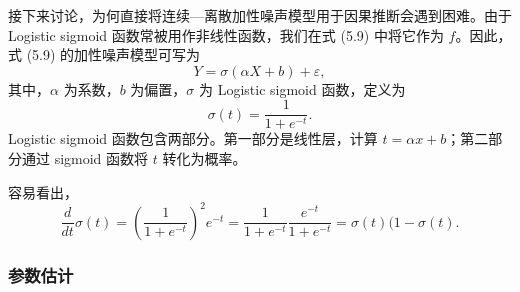 接下来讨论，为何直接将连续—离散加性噪声模型用于因果推断会遇到困难。由于 Logistic sigmoid 函数常被用作非线性函数，我们在式 (5.9) 中将它作为 $f$。因此，式 (5.9) 的加性噪声模型可写为
\begin{equation}
Y=\sigma(\alpha X+b)+\varepsilon,
\tag{5.10}
\end{equation}
其中，$\alpha$ 为系数，$b$ 为偏置，$\sigma$ 为 Logistic sigmoid 函数，定义为
\begin{equation}
\sigma(t)=\frac1{1+e^{-t}}.
\tag{5.11}
\end{equation}
Logistic sigmoid 函数包含两部分。第一部分是线性层，计算 $t=\alpha x+b$；第二部分通过 sigmoid 函数将 $t$ 转化为概率。

容易看出，
\begin{equation}
\frac{d}{dt}\sigma(t)
=\left(\frac1{1+e^{-t}}\right)^2e^{-t}
=\frac1{1+e^{-t}}\frac{e^{-t}}{1+e^{-t}}
=\sigma(t)(1-\sigma(t).
\tag{5.12}
\end{equation}

\subsubsection{参数估计}

